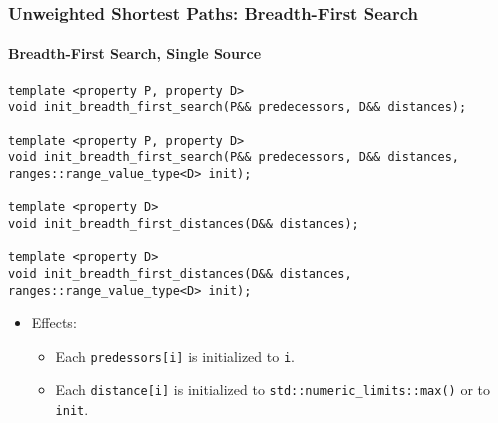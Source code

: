 \subsubsection{Unweighted Shortest Paths: Breadth-First Search}

\paragraph{Breadth-First Search, Single Source}

\begin{lstlisting}
template <property P, property D>
void init_breadth_first_search(P&& predecessors, D&& distances);

template <property P, property D>
void init_breadth_first_search(P&& predecessors, D&& distances, ranges::range_value_type<D> init);

template <property D>
void init_breadth_first_distances(D&& distances);

template <property D>
void init_breadth_first_distances(D&& distances, ranges::range_value_type<D> init);
\end{lstlisting}

\begin{itemize}
\item[] 
Effects:
\begin{itemize}
\item[]
  Each \lstinline{predessors[i]} is initialized to \lstinline{i}.
\item[] Each 
\lstinline{distance[i]} is initialized to \lstinline{std::numeric_limits::max()}
or to \lstinline{init}.
\end{itemize}
\end{itemize}

